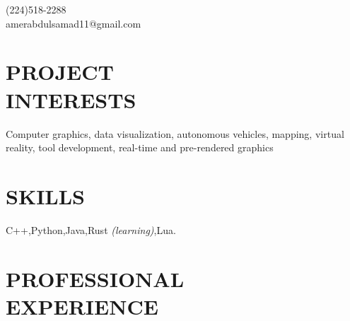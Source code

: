 \documentclass[margin,line]{resume}
\begin{document}
{
	\sc
    \hfill (224)518-2288                  \vspace{0mm}\\\vspace{0mm}%
    \hfill amerabdulsamad11@gmail.com            \vspace{0mm}\\\vspace{0mm}%
}

\begin{resume}

\vspace{1mm}

    \section{\mysidestyle \textbf{\large{P}\small{ROJECT\\INTERESTS}}}

	Computer graphics, data visualization, autonomous vehicles, mapping, virtual reality, tool development, real-time and pre-rendered graphics

\sectionline

    \section{\mysidestyle \textbf{\large{S}\small{KILLS}}}

    C++,\hspace{2mm}Python,\hspace{2mm}Java,\hspace{2mm}Rust \textsl{\small(learning)},\hspace{2mm}Lua.


\sectionline

    \section{\mysidestyle \textbf{\large{P}\small{ROFESSIONAL\\EXPERIENCE}}}


\end{resume}
\end{document}
